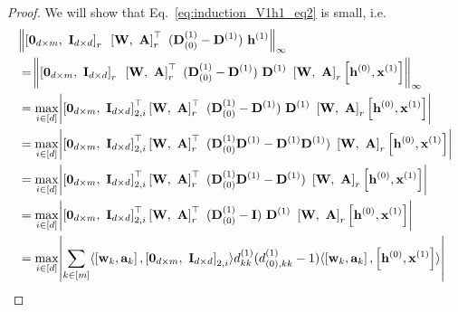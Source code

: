 \begin{proof}
	
	\iffalse
	We will show that Eq.~\ref{eq:induction_V1h1_eq2} is small, i.e.
	\begingroup \allowdisplaybreaks
	\begin{align*}
		&\norm{\left[\mathbf{0}_{d \times m}, \text{ } \mathbf{I}_{d \times d}\right]_r  \text{ } \left[\mathbf{W}, \text{ } \mathbf{A}\right]_r^{\top} \text{ } (\mathbf{D}^{(1)}_{(0)} - \mathbf{D}^{(1)}) \text{ } \mathbf{h}^{(1)}}_\infty \\&= 
		\norm{\left[\mathbf{0}_{d \times m}, \text{ } \mathbf{I}_{d \times d}\right]_r  \text{ } \left[\mathbf{W}, \text{ } \mathbf{A}\right]_r^{\top} \text{ } (\mathbf{D}^{(1)}_{(0)} - \mathbf{D}^{(1)}) \text{ } \mathbf{D}^{(1)} \text{ } \left[\mathbf{W}, \text{ } \mathbf{A}\right]_r \left[\mathbf{h}^{(0)}, \mathbf{x}^{(1)}\right] }_\infty 
		\\&= \max_{i \in [d]} \abs{ \left[\mathbf{0}_{d \times m}, \text{ } \mathbf{I}_{d \times d}\right]_{2, i}^{\top} \left[\mathbf{W}, \text{ } \mathbf{A}\right]_r^{\top} \text{ } (\mathbf{D}^{(1)}_{(0)} - \mathbf{D}^{(1)}) \text{ } \mathbf{D}^{(1)} \text{ } \left[\mathbf{W}, \text{ } \mathbf{A}\right]_r \left[\mathbf{h}^{(0)}, \mathbf{x}^{(1)}\right] } \\&
		= \max_{i \in [d]} \abs{ \left[\mathbf{0}_{d \times m}, \text{ } \mathbf{I}_{d \times d}\right]_{2, i}^{\top} \left[\mathbf{W}, \text{ } \mathbf{A}\right]_r^{\top} \text{ } (\mathbf{D}^{(1)}_{(0)} \mathbf{D}^{(1)} - \mathbf{D}^{(1)} \mathbf{D}^{(1)}) \text{ } \left[\mathbf{W}, \text{ } \mathbf{A}\right]_r \left[\mathbf{h}^{(0)}, \mathbf{x}^{(1)}\right] } \\&
		= \max_{i \in [d]} \abs{ \left[\mathbf{0}_{d \times m}, \text{ } \mathbf{I}_{d \times d}\right]_{2, i}^{\top} \left[\mathbf{W}, \text{ } \mathbf{A}\right]_r^{\top} \text{ } (\mathbf{D}^{(1)}_{(0)} \mathbf{D}^{(1)} - \mathbf{D}^{(1)}) \text{ } \left[\mathbf{W}, \text{ } \mathbf{A}\right]_r \left[\mathbf{h}^{(0)}, \mathbf{x}^{(1)}\right] }  \\&
		= \max_{i \in [d]} \abs{ \left[\mathbf{0}_{d \times m}, \text{ } \mathbf{I}_{d \times d}\right]_{2, i}^{\top} \left[\mathbf{W}, \text{ } \mathbf{A}\right]_r^{\top} \text{ } (\mathbf{D}^{(1)}_{(0)} - \mathbf{I}) \text{ } \mathbf{D}^{(1)} \text{ } \left[\mathbf{W}, \text{ } \mathbf{A}\right]_r \left[\mathbf{h}^{(0)}, \mathbf{x}^{(1)}\right] } \\&
		= \max_{i \in [d]} \abs{\sum_{k \in [m]} \langle \left[\mathbf{w}_k, \mathbf{a}_k\right], \left[\mathbf{0}_{d \times m}, \text{ } \mathbf{I}_{d \times d}\right]_{2, i}\rangle d^{(1)}_{kk} (d^{(1)}_{(0), kk} - 1) \langle \left[\mathbf{w}_k, \mathbf{a}_k\right],  \left[\mathbf{h}^{(0)}, \mathbf{x}^{(1)}\right] \rangle}

\end{align*}
\end{proof}
